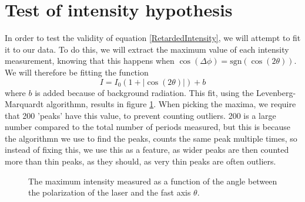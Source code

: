 \section{Test of intensity hypothesis}
In order to test the validity of equation \eqref{RetardedIntensity}, 
we will attempt to fit it to our data.
To do this, we will extract the maximum value of each intensity measurement,
knowing that this happens when $\cos(\Delta \phi) = \text{sgn}(\cos(2\theta))$.
We will therefore be fitting the function
\[I = I_0(1 + |\cos(2\theta)|) + b\]
where $b$ is added because of background radiation. 
This fit, using the Levenberg-Marquardt algorithmn, results in figure \ref{fig:WaveplateFit}.
When picking the maxima, we require that 200 'peaks' have this value, to prevent counting outliers.
200 is a large number compared to the total number of periods measured, but this is because the algorithmn we use to find the peaks, 
counts the same peak multiple times, so instead of fixing this, we use this as a feature, as wider peaks are then counted more than thin peaks, as they should,
as very thin peaks are often outliers.
\begin{figure}
    \centering
    
    \caption{The maximum intensity measured as a function of the angle between the polarization of the laser and the fast axis $\theta$.}
    \label{fig:WaveplateFit}
\end{figure}